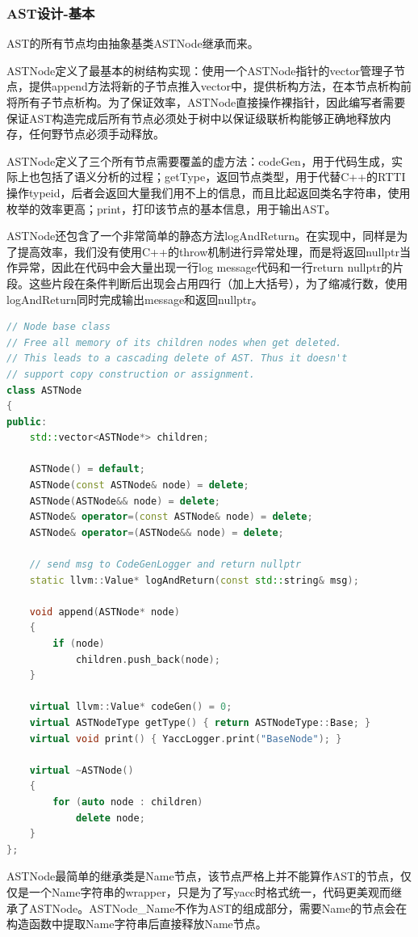 \documentclass{article}
\begin{document}
\subsubsection{AST设计-基本}
\par AST的所有节点均由抽象基类ASTNode继承而来。
\par ASTNode定义了最基本的树结构实现：使用一个ASTNode指针的vector管理子节点，提供append方法将新的子节点推入vector中，提供析构方法，在本节点析构前将所有子节点析构。为了保证效率，ASTNode直接操作裸指针，因此编写者需要保证AST构造完成后所有节点必须处于树中以保证级联析构能够正确地释放内存，任何野节点必须手动释放。
\par ASTNode定义了三个所有节点需要覆盖的虚方法：codeGen，用于代码生成，实际上也包括了语义分析的过程；getType，返回节点类型，用于代替C++的RTTI操作typeid，后者会返回大量我们用不上的信息，而且比起返回类名字符串，使用枚举的效率更高；print，打印该节点的基本信息，用于输出AST。
\par ASTNode还包含了一个非常简单的静态方法logAndReturn。在实现中，同样是为了提高效率，我们没有使用C++的throw机制进行异常处理，而是将返回nullptr当作异常，因此在代码中会大量出现一行log message代码和一行return nullptr的片段。这些片段在条件判断后出现会占用四行（加上大括号），为了缩减行数，使用logAndReturn同时完成输出message和返回nullptr。
\begin{lstlisting}[language=C++]
// Node base class
// Free all memory of its children nodes when get deleted.
// This leads to a cascading delete of AST. Thus it doesn't
// support copy construction or assignment.
class ASTNode
{
public:
    std::vector<ASTNode*> children;

    ASTNode() = default;
    ASTNode(const ASTNode& node) = delete;
    ASTNode(ASTNode&& node) = delete;
    ASTNode& operator=(const ASTNode& node) = delete;
    ASTNode& operator=(ASTNode&& node) = delete;

    // send msg to CodeGenLogger and return nullptr
    static llvm::Value* logAndReturn(const std::string& msg);

    void append(ASTNode* node)
    {
        if (node)
            children.push_back(node);
    }

    virtual llvm::Value* codeGen() = 0;
    virtual ASTNodeType getType() { return ASTNodeType::Base; }
    virtual void print() { YaccLogger.print("BaseNode"); }

    virtual ~ASTNode()
    {
        for (auto node : children)
            delete node;
    }
};
\end{lstlisting}
\par ASTNode最简单的继承类是Name节点，该节点严格上并不能算作AST的节点，仅仅是一个Name字符串的wrapper，只是为了写yacc时格式统一，代码更美观而继承了ASTNode。ASTNode\_Name不作为AST的组成部分，需要Name的节点会在构造函数中提取Name字符串后直接释放Name节点。
\end{document}
